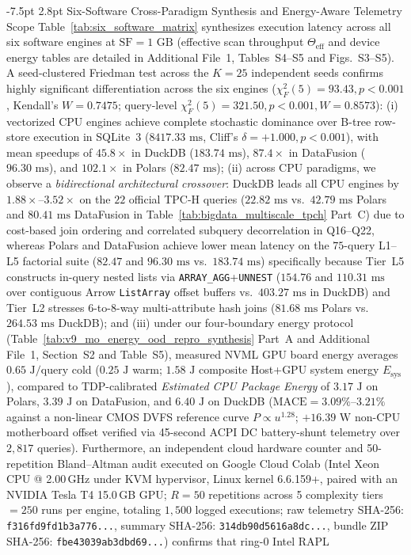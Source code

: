 \documentclass[10pt,a4paper]{article}
\makeatletter
\renewcommand\subsection{\@startsection{subsection}{2}{\z@}%
  {-7.5pt \@plus -2pt \@minus -1pt}%
  {2.8pt \@plus 1pt}%
  {\normalfont\normalsize\bfseries}}
\makeatother
\begin{document}
\subsection{Six-Software Cross-Paradigm Synthesis and Energy-Aware Telemetry Scope}
Table~\ref{tab:six_software_matrix} synthesizes execution latency across all six software engines at $\text{SF}=1\text{ GB}$ (effective scan throughput $\Theta_{\text{eff}}$ and device energy tables are detailed in Additional File~1, Tables~S4--S5 and Figs.~S3--S5). A seed-clustered Friedman test across the $K=25$ independent seeds confirms highly significant differentiation across the six engines ($\chi^2_F(5) = 93.43, p < 0.001$, Kendall's $W = 0.7475$; query-level $\chi^2_F(5) = 321.50, p < 0.001, W = 0.8573$): (i) vectorized CPU engines achieve complete stochastic dominance over B-tree row-store execution in SQLite~3 ($8417.33\text{ ms}$, Cliff's $\delta = +1.000, p < 0.001$), with mean speedups of $45.8\times$ in DuckDB ($183.74\text{ ms}$), $87.4\times$ in DataFusion ($96.30\text{ ms}$), and $102.1\times$ in Polars ($82.47\text{ ms}$); (ii) across CPU paradigms, we observe a \emph{bidirectional architectural crossover}: DuckDB leads all CPU engines by $1.88\times\text{--}3.52\times$ on the $22$ official TPC-H queries ($22.82\text{ ms}$ vs.\ $42.79\text{ ms}$ Polars and $80.41\text{ ms}$ DataFusion in Table~\ref{tab:bigdata_multiscale_tpch} Part~C) due to cost-based join ordering and correlated subquery decorrelation in Q16--Q22, whereas Polars and DataFusion achieve lower mean latency on the $75$-query L1--L5 factorial suite ($82.47$ and $96.30\text{ ms}$ vs.\ $183.74\text{ ms}$) specifically because Tier~L5 constructs in-query nested lists via \texttt{ARRAY\_AGG}+\texttt{UNNEST} ($154.76$ and $110.31\text{ ms}$ over contiguous Arrow \texttt{ListArray} offset buffers vs.\ $403.27\text{ ms}$ in DuckDB) and Tier~L2 stresses 6-to-8-way multi-attribute hash joins ($81.68\text{ ms}$ Polars vs.\ $264.53\text{ ms}$ DuckDB); and (iii) under our four-boundary energy protocol (Table~\ref{tab:v9_mo_energy_ood_repro_synthesis} Part~A and Additional File~1, Section~S2 and Table~S5), measured NVML GPU board energy averages $0.65\text{ J/query}$ cold ($0.25\text{ J}$ warm; $1.58\text{ J}$ composite Host+GPU system energy $E_{\text{sys}}$), compared to TDP-calibrated \emph{Estimated CPU Package Energy} of $3.17\text{ J}$ on Polars, $3.39\text{ J}$ on DataFusion, and $6.40\text{ J}$ on DuckDB ($\text{MACE}=3.09\%\text{--}3.21\%$ against a non-linear CMOS DVFS reference curve $P\propto u^{1.28}$; $+16.39\text{ W}$ non-CPU motherboard offset verified via 45-second ACPI DC battery-shunt telemetry over $2{,}817$ queries). Furthermore, an independent cloud hardware counter and 50-repetition Bland--Altman audit executed on Google Cloud Colab (Intel Xeon CPU @ 2.00\,GHz under KVM hypervisor, Linux kernel 6.6.159+, paired with an NVIDIA Tesla T4 15.0\,GB GPU; $R=50$ repetitions across 5 complexity tiers $= 250$ runs per engine, totaling $1{,}500$ logged executions; raw telemetry SHA-256: \texttt{f316fd9fd1b3a776...}, summary SHA-256: \texttt{314db90d5616a8dc...}, bundle ZIP SHA-256: \texttt{fbe43039ab3dbd69...}) confirms that ring-0 Intel RAPL 
\end{document}
